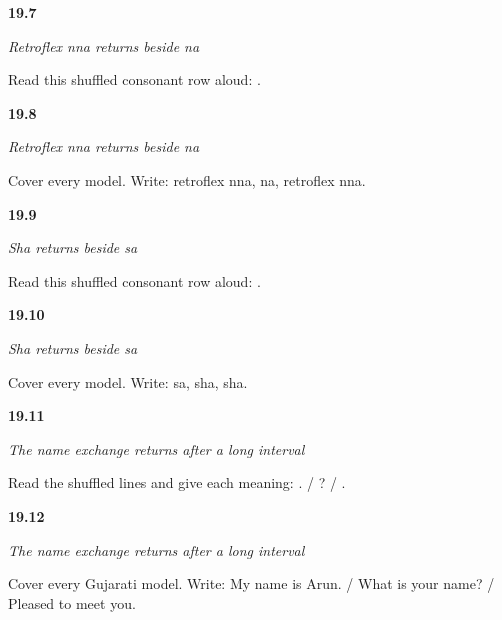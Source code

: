 \noindent\begin{minipage}[t]{\linewidth}
\raggedright
\hypertarget{review-GU-R15-nna-r4-reading}{\textbf{19.7}} \emph{Retroflex nna returns beside na}\par
\small Read this shuffled consonant row aloud:   .
\end{minipage}\par\medskip

\noindent\begin{minipage}[t]{\linewidth}
\raggedright
\hypertarget{review-GU-R15-nna-r4-dictation}{\textbf{19.8}} \emph{Retroflex nna returns beside na}\par
\small Cover every model. Write: retroflex nna, na, retroflex nna.
\end{minipage}\par\medskip

\noindent\begin{minipage}[t]{\linewidth}
\raggedright
\hypertarget{review-GU-R15-sha-r4-reading}{\textbf{19.9}} \emph{Sha returns beside sa}\par
\small Read this shuffled consonant row aloud:   .
\end{minipage}\par\medskip

\noindent\begin{minipage}[t]{\linewidth}
\raggedright
\hypertarget{review-GU-R15-sha-r4-dictation}{\textbf{19.10}} \emph{Sha returns beside sa}\par
\small Cover every model. Write: sa, sha, sha.
\end{minipage}\par\medskip

\noindent\begin{minipage}[t]{\linewidth}
\raggedright
\hypertarget{review-GU-R15-name-exchange-r3-reading}{\textbf{19.11}} \emph{The name exchange returns after a long interval}\par
\small Read the shuffled lines and give each meaning:    . /    ? /    .
\end{minipage}\par\medskip

\noindent\begin{minipage}[t]{\linewidth}
\raggedright
\hypertarget{review-GU-R15-name-exchange-r3-production}{\textbf{19.12}} \emph{The name exchange returns after a long interval}\par
\small Cover every Gujarati model. Write: My name is Arun. / What is your name? / Pleased to meet you.
\end{minipage}\par\medskip

